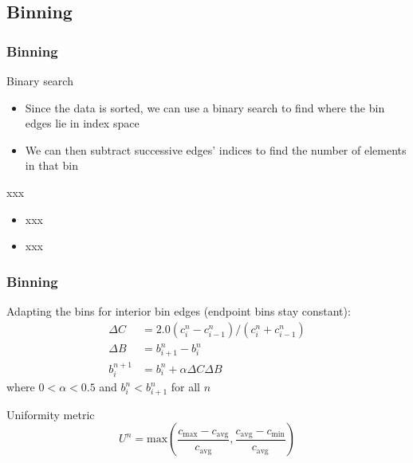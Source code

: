 \documentclass{beamer}
\begin{document}
\subsection{Binning}

\begin{frame}	
	\frametitle{Binning}
	
	\begin{block}{Binary search}
		\begin{itemize}
			\item Since the data is sorted, we can use a binary search to find where the bin edges lie in index space
			\item We can then subtract successive edges' indices to find the number of elements in that bin
		\end{itemize}
	\end{block}
	
	\begin{block}{xxx}
		\begin{itemize}
			\item xxx
			\item xxx
		\end{itemize}
	\end{block}
\end{frame}

\begin{frame}
	\frametitle{Binning}
	
	\begin{block}{Adapting the bins}
		for interior bin edges (endpoint bins stay constant):
		\begin{equation}
			\begin{split}
				\Delta C & = 2.0 ( c_i^n - c_{i-1}^n ) / ( c_i^n + c_{i-1}^n ) \\
				\Delta B & = b_{i+1}^n - b_i^n \\
				b_i^{n+1} & = b_i^n + \alpha \Delta C \Delta B
			\end{split}
		\end{equation}
		where $0 < \alpha < 0.5$ and $b_i^n < b_{i+1}^n$ for all $n$
	\end{block}
	
	\begin{block}{Uniformity metric}
		\begin{equation}
			U^n = \textrm{max}( \dfrac{c_{\textrm{max}} - c_{\textrm{avg}}}{c_{\textrm{avg}}}, \dfrac{c_{\textrm{avg}} - c_{\textrm{min}}}{c_{\textrm{avg}}} )
		\end{equation}
	\end{block}
\end{frame}
\end{document}
